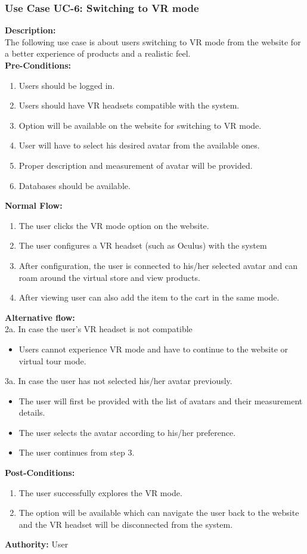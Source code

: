 \subsubsection{Use Case UC-6: Switching to VR mode}
\textbf{Description:}\\
The following use case is about users switching to VR mode from the website for a better experience of products and a realistic feel. 
\\
\textbf{Pre-Conditions:}
\begin{enumerate}
 \item Users should be logged in. 
\item Users should have VR headsets compatible with the system.
\item Option will be available on the website for switching to VR mode.
\item User will have to select his desired avatar from the available ones.
\item Proper description and measurement of avatar will be provided. 
\item Databases should be available.\end{enumerate}
\textbf{Normal Flow:}\\
\begin{enumerate}
\item The user clicks the VR mode option on the website.
\item The user configures a VR headset (such as Oculus) with the system
\item After configuration, the user is connected to his/her selected avatar and can roam around the virtual store and view products. 
\item After viewing user can also add the item to the cart in the same mode. 
\end{enumerate}
\textbf{Alternative flow:}\\  
2a. In case the user’s VR headset is not compatible
\begin{itemize}
    \item Users cannot experience VR mode and have to continue to the website or virtual tour mode.
\end{itemize}
3a. In case the user has not selected his/her avatar previously.
\begin{itemize}
    \item The user will first be provided with the list of avatars and their measurement details.
    \item The user selects the avatar according to his/her preference.
    \item	The user continues from step 3.
\end{itemize}
\textbf{Post-Conditions: }
\begin{enumerate}
\item	The user successfully explores the VR mode.
\item	The option will be available which can navigate the user back to the website and the VR headset will be disconnected from the system. 
\end{enumerate}
\textbf{Authority:}
User
